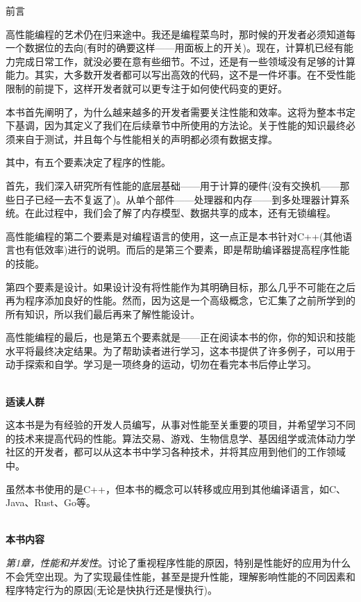 \begin{flushright}
 前言
\end{flushright}

高性能编程的艺术仍在归来途中。我还是编程菜鸟时，那时候的开发者必须知道每一个数据位的去向(有时的确要这样——用面板上的开关)。现在，计算机已经有能力完成日常工作，就没必要在意有些细节。不过，还是有一些领域没有足够的计算能力。其实，大多数开发者都可以写出高效的代码，这不是一件坏事。在不受性能限制的前提下，这样开发者就可以更专注于如何使代码变的更好。

本书首先阐明了，为什么越来越多的开发者需要关注性能和效率。这将为整本书定下基调，因为其定义了我们在后续章节中所使用的方法论。关于性能的知识最终必须来自于测试，并且每个与性能相关的声明都必须有数据支撑。

其中，有五个要素决定了程序的性能。

首先，我们深入研究所有性能的底层基础——用于计算的硬件(没有交换机——那些日子已经一去不复返了)。从单个部件——处理器和内存——到多处理器计算系统。在此过程中，我们会了解了内存模型、数据共享的成本，还有无锁编程。

高性能编程的第二个要素是对编程语言的使用，这一点正是本书针对C++(其他语言也有低效率)进行的说明。而后的是第三个要素，即是帮助编译器提高程序性能的技能。

第四个要素是设计。如果设计没有将性能作为其明确目标，那么几乎不可能在之后再为程序添加良好的性能。然而，因为这是一个高级概念，它汇集了之前所学到的所有知识，所以我们最后再来了解性能设计。

高性能编程的最后，也是第五个要素就是——正在阅读本书的你，你的知识和技能水平将最终决定结果。为了帮助读者进行学习，这本书提供了许多例子，可以用于动手探索和自学。学习是一项终身的运动，切勿在看完本书后停止学习。

\hspace*{\fill} \\ %
\noindent\textbf{适读人群}

这本书是为有经验的开发人员编写，从事对性能至关重要的项目，并希望学习不同的技术来提高代码的性能。算法交易、游戏、生物信息学、基因组学或流体动力学社区的开发者，都可以从这本书中学习各种技术，并将其应用到他们的工作领域中。

虽然本书使用的是C++，但本书的概念可以转移或应用到其他编译语言，如C、Java、Rust、Go等。

\hspace*{\fill} \\ %
\textbf{本书内容}

\textit{第1章，性能和并发性}。讨论了重视程序性能的原因，特别是性能好的应用为什么不会凭空出现。为了实现最佳性能，甚至是提升性能，理解影响性能的不同因素和程序特定行为的原因(无论是快执行还是慢执行)。

